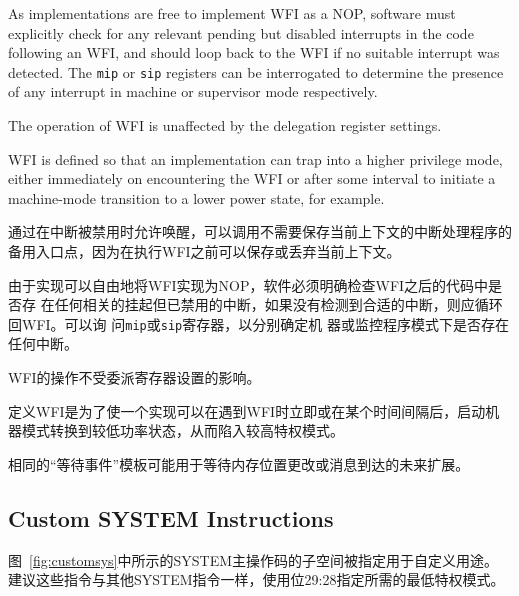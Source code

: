 {\begin{commentary}
As implementations are free to implement WFI as a NOP, software must
explicitly check for any relevant pending but disabled interrupts in
the code following an WFI, and should loop back to the WFI if no
suitable interrupt was detected.  The {\tt mip} or {\tt sip}
registers can be interrogated to determine the presence
of any interrupt in machine or supervisor mode
respectively.

The operation of WFI is unaffected by the delegation register settings.

WFI is defined so that an implementation can trap into a higher
privilege mode, either immediately on encountering the WFI or after
some interval to initiate a machine-mode transition to a lower power
state, for example.
\end{commentary}
\fi
\begin{commentary}
通过在中断被禁用时允许唤醒，可以调用不需要保存当前上下文的中断处理程序的备用入口点，因为在执行WFI之前可以保存或丢弃当前上下文。

由于实现可以自由地将WFI实现为NOP，软件必须明确检查WFI之后的代码中是否存
在任何相关的挂起但已禁用的中断，如果没有检测到合适的中断，则应循环回WFI。可以询
问{\tt mip}或{\tt sip}寄存器，以分别确定机
器或监控程序模式下是否存在任何中断。

WFI的操作不受委派寄存器设置的影响。

定义WFI是为了使一个实现可以在遇到WFI时立即或在某个时间间隔后，启动机器模式转换到较低功率状态，从而陷入较高特权模式。
\end{commentary}

\iffalse
\begin{commentary}
The same ``wait-for-event'' template might be used for possible future
extensions that wait on memory locations changing, or message
arrival.
\end{commentary}
\fi
\begin{commentary}
相同的“等待事件”模板可能用于等待内存位置更改或消息到达的未来扩展。
\end{commentary}

\subsection{Custom SYSTEM Instructions}
\label{sec:customsys}

\iffalse
The subspace of the SYSTEM major opcode shown in Figure~\ref{fig:customsys}
is designated for custom use.
It is recommended that these instructions use bits 29:28 to designate the
minimum required privilege mode, as do other SYSTEM instructions.
\fi
图~\ref{fig:customsys}中所示的SYSTEM主操作码的子空间被指定用于自定义用途。
建议这些指令与其他SYSTEM指令一样，使用位29:28指定所需的最低特权模式。

}

